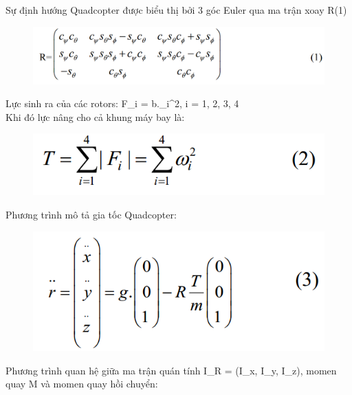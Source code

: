         Sự định hướng Quadcopter được biểu thị bởi 3 góc Euler qua ma trận xoay R(1)
        \\
        \begin{figure}[h!]
	        	\begin{center}
	        		\includegraphics[scale=0.8]{images/Cuong-R1.png}
	        	\end{center}
        \end{figure}
        Lực sinh ra của các rotors: F_i = b.\omega_i^2, i = 1, 2, 3, 4
       \\
        Khi đó lực nâng cho cả khung máy bay là:
        \\
        \begin{figure}[h!]
	        	\begin{center}
	        		\includegraphics[scale=0.8]{images/Cuong-2.png}
	        	\end{center}
        \end{figure}
        Phương trình mô tả gia tốc Quadcopter:
        \\
        \begin{figure}[h!]
	        	\begin{center}
	        		\includegraphics[scale=0.8]{images/Cuong-3.png}
	        	\end{center}
        \end{figure}
        Phương trình quan hệ giữa ma trận quán tính I_R = (I_x, I_y, I_z), momen quay M và momen quay hồi chuyển:
